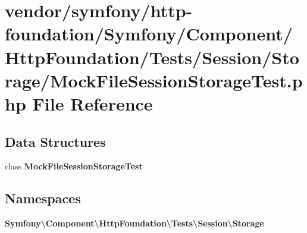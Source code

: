 \section{vendor/symfony/http-\/foundation/\+Symfony/\+Component/\+Http\+Foundation/\+Tests/\+Session/\+Storage/\+Mock\+File\+Session\+Storage\+Test.php File Reference}
\label{_mock_file_session_storage_test_8php}
\subsection*{Data Structures}
\begin{DoxyCompactItemize}
\item 
class {\bf Mock\+File\+Session\+Storage\+Test}
\end{DoxyCompactItemize}
\subsection*{Namespaces}
\begin{DoxyCompactItemize}
\item 
 {\bf Symfony\textbackslash{}\+Component\textbackslash{}\+Http\+Foundation\textbackslash{}\+Tests\textbackslash{}\+Session\textbackslash{}\+Storage}
\end{DoxyCompactItemize}
